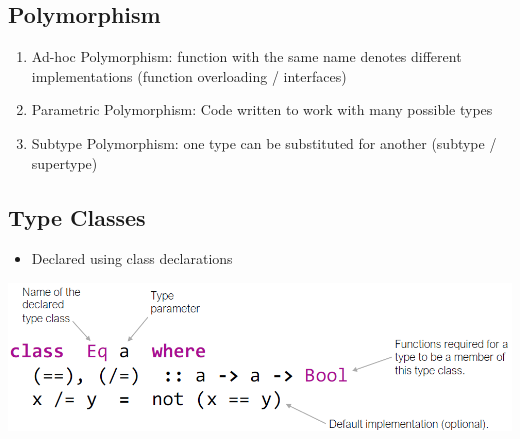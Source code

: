 \subsection{Polymorphism}
\begin{enumerate}
    \item Ad-hoc Polymorphism: function with the same name denotes different implementations (function overloading / interfaces)
    \item Parametric Polymorphism: Code written to work with many possible types
    \item Subtype Polymorphism: one type can be substituted for another (subtype / supertype)
\end{enumerate}

\subsection{Type Classes}
\begin{itemize}
    \item Declared using class declarations
\end{itemize}
\includegraphics[width=0.7\linewidth]{img/class_declarations.png}